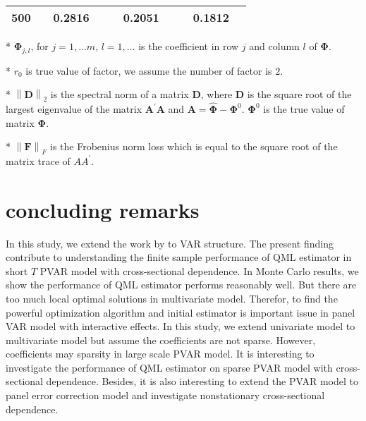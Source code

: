 \documentclass[12pt,a4paper,hyperref]{article}
\begin{document}
\begin{table}[H]
\begin{threeparttable}
\begin{tabular} {*{10}{c}}
500& &0.2816& &  & 0.2051& & & 0.1812& \\
\bottomrule
\end{tabular}
\begin{tablenotes}
\footnotesize
  \item[*] $\boldsymbol{\Phi}_{j,l}$, for $j=1,\ldots m$, $l=1,\ldots$ is the coefficient in row $j$ and column $l$ of $\boldsymbol{\Phi}$.
\item[*] $r_{0}$ is true value of factor, we assume the number of factor is $2$.
 \item[*] $\left\| \boldsymbol{D} \right\|_{2}$ is the spectral norm of a matrix $\boldsymbol{D}$, where $\boldsymbol{D}$ is the square root of the largest eigenvalue of the matrix $\boldsymbol{A}^{'}\boldsymbol{A}$ and $\boldsymbol{A}=\hat{\boldsymbol{\Phi}}- \boldsymbol{\Phi}^{0}$. $\boldsymbol{\Phi}^{0}$ is the true value of matrix $\boldsymbol{\Phi}$.
 \item[*] $\left\| \boldsymbol{F} \right\|_{F} $ is the Frobenius norm loss which is equal to the square root of the matrix trace of $AA^{'}$.
    \end{tablenotes}
\end{threeparttable}
\end{table}





\section{concluding remarks}
In this study, we extend the work by \citet{Hayakawa:2018} to VAR structure. The present finding contribute to understanding the finite sample performance of QML estimator in short $T$ PVAR model with cross-sectional dependence.
 In Monte Carlo results, we show the  performance of QML estimator performs reasonably well. But there are too much local optimal solutions in multivariate model. Therefor, to find the powerful optimization algorithm and initial estimator is important issue in panel VAR model with interactive effects.
  In this study, we extend univariate model to multivariate model but assume the coefficients are not sparse. However, coefficients may sparsity in large scale PVAR model.  It is interesting to investigate the performance of QML estimator on sparse PVAR model with cross-sectional dependence.   Besides, it is also interesting to extend the PVAR model to panel error correction model and investigate nonstationary cross-sectional dependence.
\end{document}
